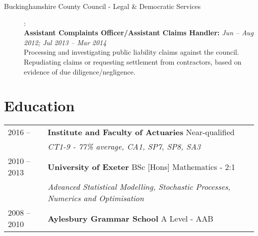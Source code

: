 \documentclass[11pt]{article}
\begin{document}
\begin{description}
\item[Buckinghamshire County Council - Legal \& Democratic Services]:\\
\textbf{Assistant Complaints Officer/Assistant Claims Handler:} \emph{Jun -- Aug 2012; Jul 2013 -- Mar 2014}\\
\textbullet \quad Processing and investigating public liability claims against the council. Repudiating claims or requesting settlement from contractors, based on evidence of due diligence/negligence. 

\end{description}

\section*{Education}
\begin{tabular}{l | l l}
2016 --  & \textbf{Institute and Faculty of Actuaries} Near-qualified \\
& \hspace{4mm} \textit{CT1-9 - 77\% average, CA1, SP7, SP8, SA3} \\
2010 -- 2013 & \textbf{University of Exeter} BSc [Hons] Mathematics - 2:1\\
& \hspace{4mm} \textit{Advanced Statistical Modelling, Stochastic Processes, Numerics and Optimisation }\\
2008 -- 2010 & \textbf{Aylesbury Grammar School} A Level - AAB \\
\end{tabular}
\end{document}
